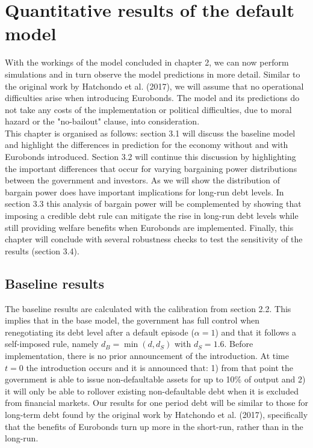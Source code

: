 \pagestyle{headings}

\chapter{Quantitative results of the default model}
With the workings of the model concluded in chapter 2, we can now perform simulations and in turn observe the model predictions in more detail. Similar to the original work by Hatchondo et al. (2017), we will assume that no operational difficulties arise when introducing Eurobonds. The model and its predictions do not take any costs of the implementation or political difficulties, due to moral hazard or the "no-bailout" clause, into consideration.\\ 

This chapter is organised as follows: section 3.1 will discuss the baseline model and highlight the differences in prediction for the economy without and with Eurobonds introduced. Section 3.2 will continue this discussion by highlighting the important differences that occur for varying bargaining power distributions between the government and investors. As we will show the distribution of bargain power does have important implications for long-run debt levels. In section 3.3 this analysis of bargain power will be complemented by showing that imposing a credible debt rule can mitigate the rise in long-run debt levels while still providing welfare benefits when Eurobonds are implemented. Finally, this chapter will conclude with several robustness checks to test the sensitivity of the results (section 3.4).\\
\section{Baseline results}
The baseline results are calculated with the calibration from section 2.2. This implies that in the base model, the government has full control when renegotiating its debt level after a default episode ($\alpha = 1$) and that it follows a self-imposed rule, namely $d_B = \min(d,d_S)$ with $d_S = 1.6$. Before implementation, there is no prior announcement of the introduction. At time $t=0$ the introduction occurs and it is announced that: 1) from that point the government is able to issue non-defaultable assets for up to 10\% of output and 2) it will only be able to rollover existing non-defaultable debt when it is excluded from financial markets. Our results for one period debt will be similar to those for long-term debt found by the original work by Hatchondo et al. (2017), specifically that the benefits of Eurobonds turn up more in the short-run, rather than in the long-run.\\
